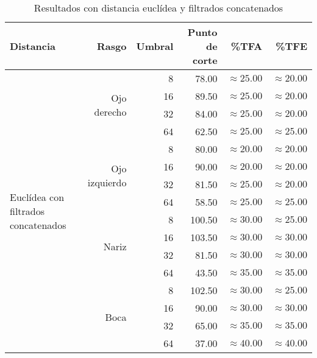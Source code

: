 \begin{table}
\begin{tabular}{|l|r|r|r|r|r|}
 \hline
  Distancia & Rasgo & Umbral & Punto de corte & \%TFA  & \%TFE \\
  \hline \hline
  \multirow{16}{*}{Euclídea con filtrados concatenados}
& \multirow{4}{*}{Ojo derecho} & 8  & 78.00 & $\approx 25.00$ & $\approx 20.00$ \\
& & 16 & 89.50 & $\approx 25.00$ & $\approx 20.00$ \\
& & 32 & 84.00 & $\approx 25.00$ & $\approx 20.00$ \\
& & 64 & 62.50 & $\approx 25.00$ & $\approx 25.00$ \\ \cline{2-6}

& \multirow{4}{*}{Ojo izquierdo} & 8  & 80.00 & $\approx 20.00$ & $\approx 20.00$ \\
& & 16 & 90.00 & $\approx 20.00$ & $\approx 20.00$ \\
& & 32 & 81.50 & $\approx 25.00$ & $\approx 20.00$ \\
& & 64 & 58.50 & $\approx 25.00$ & $\approx 25.00$ \\ \cline{2-6}

& \multirow{4}{*}{Nariz} & 8  & 100.50 & $\approx 30.00$ & $\approx 25.00$ \\
& & 16 & 103.50 & $\approx 30.00$ & $\approx 30.00$ \\
& & 32 & 81.50 & $\approx 30.00$ & $\approx 30.00$ \\
& & 64 & 43.50 & $\approx 35.00$ & $\approx 35.00$ \\ \cline{2-6}

& \multirow{4}{*}{Boca} & 8  & 102.50 & $\approx 30.00$ & $\approx 25.00$ \\
& & 16 & 90.00 & $\approx 30.00$ & $\approx 30.00$ \\
& & 32 & 65.00 & $\approx 35.00$ & $\approx 35.00$ \\
& & 64 & 37.00 & $\approx 40.00$ & $\approx 40.00$ \\ \hline

 \end{tabular}
 \caption{Resultados con distancia euclídea y filtrados concatenados}
 \label{tab:euc_con}
\end{table}
